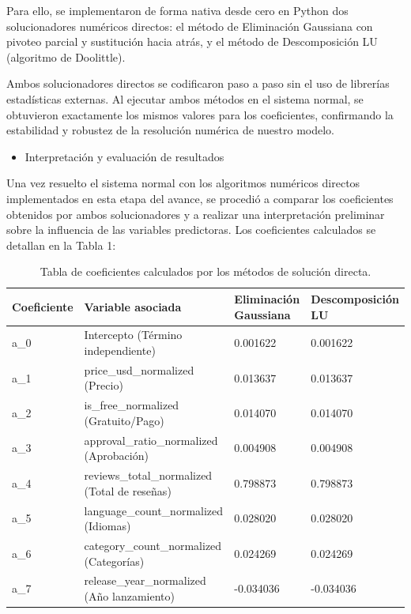\documentclass[12pt]{report}
\begin{document}
Para ello, se implementaron de forma nativa desde cero en Python dos solucionadores numéricos directos: el método de Eliminación Gaussiana con pivoteo parcial y sustitución hacia atrás, y el método de Descomposición LU (algoritmo de Doolittle). 

Ambos solucionadores directos se codificaron paso a paso sin el uso de librerías estadísticas externas. Al ejecutar ambos métodos en el sistema normal, se obtuvieron exactamente los mismos valores para los coeficientes, confirmando la estabilidad y robustez de la resolución numérica de nuestro modelo.

\begin{itemize}
    \item Interpretación y evaluación de resultados 
\end{itemize}
Una vez resuelto el sistema normal con los algoritmos numéricos directos implementados en esta etapa del avance, se procedió a comparar los coeficientes obtenidos por ambos solucionadores y a realizar una interpretación preliminar sobre la influencia de las variables predictoras. Los coeficientes calculados se detallan en la Tabla 1:

\begin{table}[h]
\centering
\begin{tabular}{|p{3cm}|p{5cm}|p{3cm}|p{3.5cm}|}
\hline
\textbf{Coeficiente} & \textbf{Variable asociada} & \textbf{Eliminación Gaussiana} & \textbf{Descomposición LU} \\ \hline
a\_0 & Intercepto (Término independiente) & 0.001622 & 0.001622 \\ \hline
a\_1 & price\_usd\_normalized (Precio) & 0.013637 & 0.013637 \\ \hline
a\_2 & is\_free\_normalized (Gratuito/Pago) & 0.014070 & 0.014070 \\ \hline
a\_3 & approval\_ratio\_normalized (Aprobación) & 0.004908 & 0.004908 \\ \hline
a\_4 & reviews\_total\_normalized (Total de reseñas) & 0.798873 & 0.798873 \\ \hline
a\_5 & language\_count\_normalized (Idiomas) & 0.028020 & 0.028020 \\ \hline
a\_6 & category\_count\_normalized (Categorías) & 0.024269 & 0.024269 \\ \hline
a\_7 & release\_year\_normalized (Año lanzamiento) & -0.034036 & -0.034036 \\ \hline
\end{tabular}
\caption{Tabla de coeficientes calculados por los métodos de solución directa.}
\end{table}
\end{document}
